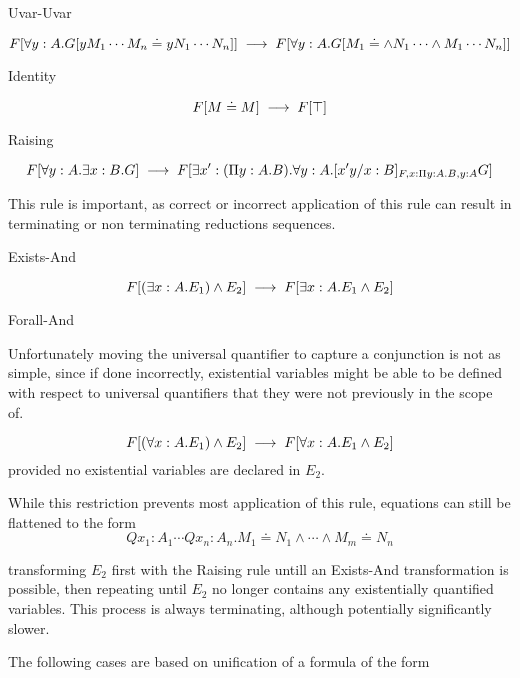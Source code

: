 \begin{tcase}
Uvar-Uvar
\end{tcase}

\[
F[\forall y : A . G[y M_1 \cdots M_n \doteq y N_1 \cdots N_n  ]]
\;\longrightarrow\;
F[\forall y : A . G[ M_1 \doteq \wedge N_1 \cdots \wedge M_1 \cdots N_n ]]
\]

\begin{tcase}
Identity
\end{tcase}

\[
F[M \doteq M] 
\;\longrightarrow\;
F[\top]
\]

\begin{tcase}
Raising
\end{tcase}

\[
F[\forall y : A . \exists x : B . G]
\;\longrightarrow\;
F[\exists x' : (\Pi y : A . B) . \forall y : A . [x' y / x : B]_{F, x : \Pi y : A . B , y : A} G]
\]

This rule is important, as correct or 
incorrect application of this rule can result in 
terminating or non terminating reductions sequences.

\begin{tcase}
Exists-And
\end{tcase}

\[
F[(\exists x : A . E_1) \wedge E_2]
\;\longrightarrow\;
F[\exists x : A . E_1 \wedge E_2]
\]

\begin{tcase}
Forall-And
\end{tcase}

Unfortunately moving the universal quantifier to
capture a conjunction is not as simple, since
if done incorrectly, existential variables might be able
to be defined with respect to universal quantifiers that they
were not previously in the scope of.

\[
F[(\forall x : A . E_1) \wedge E_2]
\;\longrightarrow\;
F[\forall x : A . E_1 \wedge E_2]
\]
provided no existential variables are declared in $E_2$.

While this restriction prevents most application of this rule, 
equations can still be flattened to the form
\[
Qx_1:A_1\cdots Qx_n : A_n . M_1 \doteq N_1 \wedge \cdots \wedge M_m \doteq N_n
\]

transforming $E_2$ first with the Raising rule untill 
an Exists-And transformation is possible, then repeating  
until $E_2$ no longer contains any existentially 
quantified variables.  This process is always terminating,
although potentially significantly slower.   


The following cases are based on unification 
of a formula of the form

